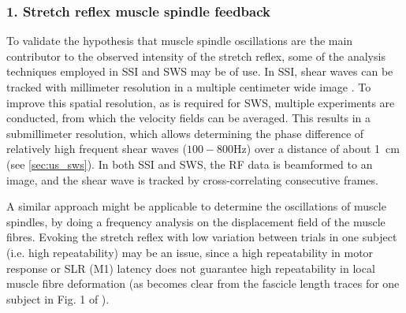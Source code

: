 


\subsubsection{1. Stretch reflex muscle spindle feedback}



To validate the hypothesis that muscle spindle oscillations are the main contributor to the observed intensity of the stretch reflex, some of the analysis techniques employed in SSI and SWS may be of use. In SSI, shear waves can be tracked with millimeter resolution in a multiple centimeter wide image \cite{deffieux_shear_2009}. To improve this spatial resolution, as is required for SWS, multiple experiments are conducted, from which the velocity fields can be averaged. This results in a submillimeter resolution, which allows determining the phase difference of relatively high frequent shear waves ($100-800$\si{\hertz}) over a distance of about \SI{1}{\centi\meter} (see \autoref{sec:us_sws}). In both SSI and SWS, the RF data is beamformed to an image, and the shear wave is tracked by cross-correlating consecutive frames. 

A similar approach might be applicable to determine the oscillations of muscle spindles, by doing a frequency analysis on the displacement field of the muscle fibres. Evoking the stretch reflex with low variation between trials in one subject (i.e. high repeatability) may be an issue, since a high repeatability in motor response or SLR (M1) latency does not guarantee high repeatability in local muscle fibre deformation (as becomes clear from the fascicle length traces for one subject in Fig. 1 of \cite{cronin_triceps_2015}). 

